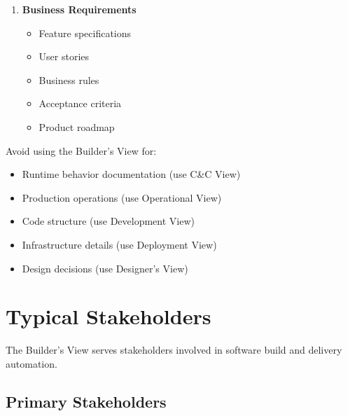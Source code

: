 \documentclass[11pt,letterpaper]{article}
\begin{document}
\begin{enumerate}[label=\textbf{AC\arabic*:}, leftmargin=2.5em]
    \item \textbf{Business Requirements}
    \begin{itemize}[nosep]
        \item Feature specifications
        \item User stories
        \item Business rules
        \item Acceptance criteria
        \item Product roadmap
    \end{itemize}
\end{enumerate}

\begin{warningbox}
Avoid using the Builder's View for:

\begin{itemize}[nosep]
    \item Runtime behavior documentation (use C\&C View)
    \item Production operations (use Operational View)
    \item Code structure (use Development View)
    \item Infrastructure details (use Deployment View)
    \item Design decisions (use Designer's View)
\end{itemize}
\end{warningbox}

\section{Typical Stakeholders}

The Builder's View serves stakeholders involved in software build and delivery automation.

\subsection{Primary Stakeholders}
\end{document}
